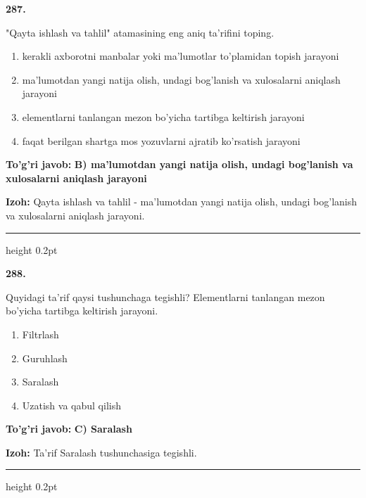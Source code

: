 \documentclass[10pt,a4paper,oneside]{article}
\begin{document}
\noindent\textbf{\color{ink}287.}
\par
"Qayta ishlash va tahlil" atamasining eng aniq ta'rifini toping.
\begin{enumerate}[label=\Alph*),leftmargin=9mm]
\item kerakli axborotni manbalar yoki ma'lumotlar to'plamidan topish jarayoni
\item ma'lumotdan yangi natija olish, undagi bog'lanish va xulosalarni aniqlash jarayoni
\item elementlarni tanlangan mezon bo'yicha tartibga keltirish jarayoni
\item faqat berilgan shartga mos yozuvlarni ajratib ko'rsatish jarayoni
\end{enumerate}
\begin{tcolorbox}[enhanced,breakable,colback=teal!4,colframe=teal!50!black,boxrule=0.5pt,arc=1.1mm,left=3mm,right=3mm,top=1.7mm,bottom=1.7mm,before skip=2mm,after skip=2mm]
\textbf{\color{teal}To'g'ri javob:} \textbf{B) ma'lumotdan yangi natija olish, undagi bog'lanish va xulosalarni aniqlash jarayoni}
\par\smallskip
\textbf{Izoh:} Qayta ishlash va tahlil - ma'lumotdan yangi natija olish, undagi bog'lanish va xulosalarni aniqlash jarayoni.
\end{tcolorbox}
\vspace{2mm}\hrule height 0.2pt \vspace{3mm}

\noindent\textbf{\color{ink}288.}
\par
Quyidagi ta'rif qaysi tushunchaga tegishli? Elementlarni tanlangan mezon bo'yicha tartibga keltirish jarayoni.
\begin{enumerate}[label=\Alph*),leftmargin=9mm]
\item Filtrlash
\item Guruhlash
\item Saralash
\item Uzatish va qabul qilish
\end{enumerate}
\begin{tcolorbox}[enhanced,breakable,colback=teal!4,colframe=teal!50!black,boxrule=0.5pt,arc=1.1mm,left=3mm,right=3mm,top=1.7mm,bottom=1.7mm,before skip=2mm,after skip=2mm]
\textbf{\color{teal}To'g'ri javob:} \textbf{C) Saralash}
\par\smallskip
\textbf{Izoh:} Ta'rif Saralash tushunchasiga tegishli.
\end{tcolorbox}
\vspace{2mm}\hrule height 0.2pt \vspace{3mm}
\end{document}
